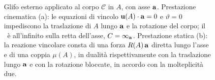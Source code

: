 \begin{figure}[htbp]
	\caption[Glifo esterno con asse $\ab$: prestazioni cinematica e statica.]{%
		Glifo esterno applicato al corpo $\mathcal{C}$ in $A$,
		con asse $\ab$. Prestazione cinematica (a): le equazioni
		di vincolo $\mathbf{u}(A)\cdot\mathbf{a} = 0$ e $\vartheta = 0$
		impediscono la traslazione di $A$ lungo $\ab$ e la
		rotazione del corpo; il \CRa\ è all'infinito sulla retta
		dell'asse, $C = \infty_{\mathbf{a}}$. Prestazione statica (b):
		la reazione vincolare consta di una forza $R(A)\,\mathbf{a}$
		diretta lungo l'asse e di una coppia $\mu(A)$, in
		dualità rispettivamente con la traslazione lungo $\ab$
		e con la rotazione bloccate, in accordo con la
		molteplicità due.}
	\label{fig:glifo_esterno}
\end{figure}

